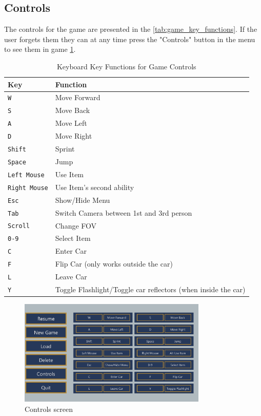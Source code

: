 \subsection{Controls}
The controls for the game are presented in the \autoref{tab:game_key_functions}.
If the user forgets them they can at any time press the "Controls" button in the menu to see them in game \ref{fig:controls}.

\begin{table}[h]
    \centering
    \begin{tabular}{|m{3cm}|m{8cm}|}
    \hline
    \textbf{Key} & \textbf{Function} \\
    \hline
    \texttt{W} & Move Forward \\
    \hline
    \texttt{S} & Move Back \\
    \hline
    \texttt{A} & Move Left \\
    \hline
    \texttt{D} & Move Right \\
    \hline
    \texttt{Shift} & Sprint \\
    \hline
    \texttt{Space} & Jump \\
    \hline
    \texttt{Left Mouse} & Use Item \\
    \hline
    \texttt{Right Mouse} & Use Item's second ability \\
    \hline
    \texttt{Esc} & Show/Hide Menu \\
    \hline
    \texttt{Tab} & Switch Camera between 1st and 3rd person \\
    \hline
    \texttt{Scroll} & Change FOV \\
    \hline
    \texttt{0-9} & Select Item \\
    \hline
    \texttt{C} & Enter Car \\
    \hline
    \texttt{F} & Flip Car (only works outside the car) \\
    \hline
    \texttt{L} & Leave Car \\
    \hline
    \texttt{Y} & Toggle Flashlight/Toggle car reflectors (when inside the car) \\
    \hline
    \end{tabular}
    \caption{Keyboard Key Functions for Game Controls}
    \label{tab:game_key_functions}
    \end{table}

\begin{figure}[H]
    \centering
    \includegraphics[width=0.8\textwidth]{sections/user_manual/resources/controls.png}
    \caption{Controls screen}
    \label{fig:controls}
\end{figure}